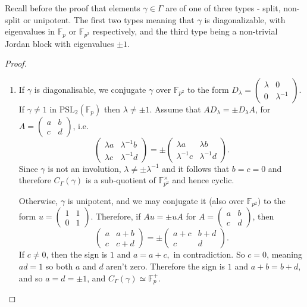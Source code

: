 \documentclass[letterpaper]{amsart}
\begin{document}
Recall before the proof that elements $\gamma \in \Gamma$ are of one of three types - split, non-split or unipotent. The first two types meaning that $\gamma$ is diagonalizable, with eigenvalues in $\mathbb{F}_p$ or $\mathbb{F}_{p^2}$ respectively, and the third type being a non-trivial Jordan block with eigenvalues $\pm 1$.
\begin{proof}
\begin{enumerate}
    \item If $\gamma$ is diagonalisable, we conjugate $\gamma$ over $\mathbb{F}_{p^2}$ to the form $D_\lambda = \begin{pmatrix}\lambda & 0 \\ 0 & \lambda^{-1}\end{pmatrix}$. If $\gamma \neq 1$ in $\mathrm{PSL}_2(\mathbb{F}_p)$ then $\lambda \neq \pm 1$. Assume that $AD_\lambda = \pm D_\lambda A$, for $A = \begin{pmatrix}a & b \\ c & d\end{pmatrix}$, i.e. $$\begin{pmatrix} \lambda a & \lambda^{-1}b \\ \lambda c & \lambda^{-1}d \end{pmatrix} = \pm\begin{pmatrix}\lambda a & \lambda b \\ \lambda^{-1}c & \lambda^{-1} d\end{pmatrix}.$$ Since $\gamma$ is not an involution, $\lambda \neq \pm \lambda^{-1}$ and it follows that $b=c=0$ and therefore $C_\Gamma(\gamma)$ is a sub-quotient of $\mathbb{F}_{p^2}^\times$ and hence cyclic.
    
    Otherwise, $\gamma$ is unipotent, and we may conjugate it (also over $\mathbb{F}_{p^2})$ to the form $u = \begin{pmatrix}1 & 1 \\ 0 & 1\end{pmatrix}$. Therefore, if $Au = \pm uA$ for $A = \begin{pmatrix}a & b \\ c & d\end{pmatrix}$, then $$\begin{pmatrix} a & a + b \\ c & c + d\end{pmatrix} = \pm\begin{pmatrix}a + c & b + d \\ c & d\end{pmatrix}.$$ If $c \neq 0$, then the sign is $1$ and $a = a + c,$ in contradiction. So $c = 0$, meaning $ad = 1$ so both $a$ and $d$ aren't zero. Therefore the sign is $1$ and $a + b = b + d$, and so $a=d=\pm 1$, and $C_\Gamma(\gamma) \simeq \mathbb{F}_p^+$.


\end{enumerate}
\end{proof}
\end{document}
